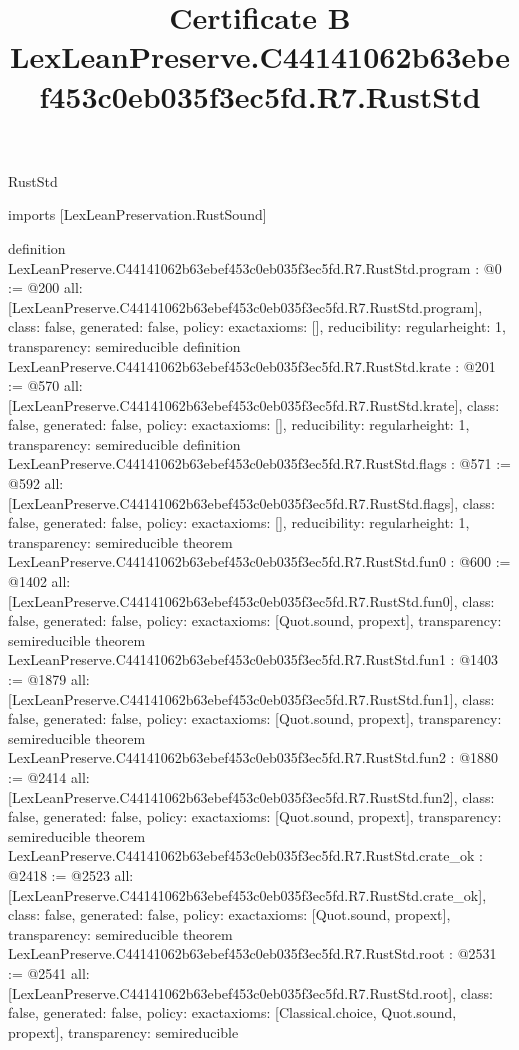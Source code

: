 \begin{lexlean}{RustStd}
\title{Certificate B LexLeanPreserve.C44141062b63ebef453c0eb035f3ec5fd.R7.RustStd}
\begin{coremodule}
imports [LexLeanPreservation.RustSound]

definition LexLeanPreserve.C44141062b63ebef453c0eb035f3ec5fd.R7.RustStd.program : @0 := @200 {
  all: [LexLeanPreserve.C44141062b63ebef453c0eb035f3ec5fd.R7.RustStd.program],
  class: false,
  generated: false,
  policy: exact{axioms: []},
  reducibility: regular{height: 1},
  transparency: semireducible
}
definition LexLeanPreserve.C44141062b63ebef453c0eb035f3ec5fd.R7.RustStd.krate : @201 := @570 {
  all: [LexLeanPreserve.C44141062b63ebef453c0eb035f3ec5fd.R7.RustStd.krate],
  class: false,
  generated: false,
  policy: exact{axioms: []},
  reducibility: regular{height: 1},
  transparency: semireducible
}
definition LexLeanPreserve.C44141062b63ebef453c0eb035f3ec5fd.R7.RustStd.flags : @571 := @592 {
  all: [LexLeanPreserve.C44141062b63ebef453c0eb035f3ec5fd.R7.RustStd.flags],
  class: false,
  generated: false,
  policy: exact{axioms: []},
  reducibility: regular{height: 1},
  transparency: semireducible
}
theorem LexLeanPreserve.C44141062b63ebef453c0eb035f3ec5fd.R7.RustStd.fun0 : @600 := @1402 {
  all: [LexLeanPreserve.C44141062b63ebef453c0eb035f3ec5fd.R7.RustStd.fun0],
  class: false,
  generated: false,
  policy: exact{axioms: [Quot.sound, propext]},
  transparency: semireducible
}
theorem LexLeanPreserve.C44141062b63ebef453c0eb035f3ec5fd.R7.RustStd.fun1 : @1403 := @1879 {
  all: [LexLeanPreserve.C44141062b63ebef453c0eb035f3ec5fd.R7.RustStd.fun1],
  class: false,
  generated: false,
  policy: exact{axioms: [Quot.sound, propext]},
  transparency: semireducible
}
theorem LexLeanPreserve.C44141062b63ebef453c0eb035f3ec5fd.R7.RustStd.fun2 : @1880 := @2414 {
  all: [LexLeanPreserve.C44141062b63ebef453c0eb035f3ec5fd.R7.RustStd.fun2],
  class: false,
  generated: false,
  policy: exact{axioms: [Quot.sound, propext]},
  transparency: semireducible
}
theorem LexLeanPreserve.C44141062b63ebef453c0eb035f3ec5fd.R7.RustStd.crate_ok : @2418 := @2523 {
  all: [LexLeanPreserve.C44141062b63ebef453c0eb035f3ec5fd.R7.RustStd.crate_ok],
  class: false,
  generated: false,
  policy: exact{axioms: [Quot.sound, propext]},
  transparency: semireducible
}
theorem LexLeanPreserve.C44141062b63ebef453c0eb035f3ec5fd.R7.RustStd.root : @2531 := @2541 {
  all: [LexLeanPreserve.C44141062b63ebef453c0eb035f3ec5fd.R7.RustStd.root],
  class: false,
  generated: false,
  policy: exact{axioms: [Classical.choice, Quot.sound, propext]},
  transparency: semireducible
}


\end{coremodule}
\end{lexlean}
